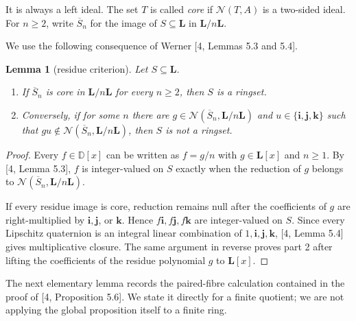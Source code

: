 \documentclass[11pt]{article}
\newtheorem{lemma}[theorem]{Lemma}
\theoremstyle{remark}
\numberwithin{equation}{section}
\begin{document}
It is always a left ideal. The set $T$ is called \emph{core} if
$\mathcal N(T,A)$ is a two-sided ideal. For $n\ge2$, write
$\overline S_n$ for the image of $S\subseteq\mathbf L$ in
$\mathbf L/n\mathbf L$.

We use the following consequence of Werner [4, Lemmas 5.3 and 5.4].

\begin{lemma}[residue criterion]

Let $S\subseteq\mathbf L$.

\begin{enumerate}
\item If $\overline S_n$ is core in $\mathbf L/n\mathbf L$ for every $n\ge2$,
then $S$ is a ringset.
\item Conversely, if for some $n$ there are
$g\in\mathcal N(\overline S_n,\mathbf L/n\mathbf L)$ and
$u\in\{\mathbf i,\mathbf j,\mathbf k\}$ such that
$gu\notin\mathcal N(\overline S_n,\mathbf L/n\mathbf L)$, then $S$ is
not a ringset.

\end{enumerate}
\end{lemma}
\begin{proof}

Every $f\in\mathbb D[x]$ can be written as $f=g/n$ with
$g\in\mathbf L[x]$ and $n\ge1$. By [4, Lemma 5.3], $f$ is integer-valued on
$S$ exactly when the reduction of $g$ belongs to
$\mathcal N(\overline S_n,\mathbf L/n\mathbf L)$.

If every residue image is core, reduction remains null after the coefficients
of $g$ are right-multiplied by $\mathbf i,\mathbf j$, or $\mathbf k$. Hence
$f\mathbf i,f\mathbf j,f\mathbf k$ are integer-valued on $S$. Since every
Lipschitz quaternion is an integral linear combination of
$1,\mathbf i,\mathbf j,\mathbf k$, [4, Lemma 5.4] gives multiplicative
closure. The same argument in reverse proves part 2 after lifting the
coefficients of the residue polynomial $g$ to $\mathbf L[x]$.
\end{proof}

The next elementary lemma records the paired-fibre calculation contained in
the proof of [4, Proposition 5.6]. We state it directly for a finite quotient;
we are not applying the global proposition itself to a finite ring.
\end{document}
